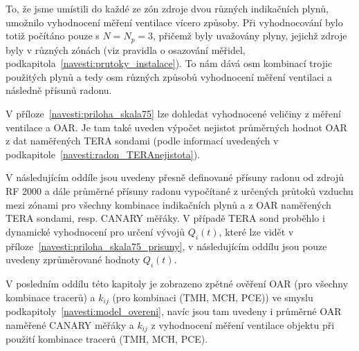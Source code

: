 To, že jsme umístili do každé ze zón zdroje dvou různých indikačních plynů, umožnilo vyhodnocení měření ventilace vícero způsoby. Při vyhodnocování bylo totiž počítáno pouze s $N=N_p=3$, přičemž byly uvažovány plyny, jejichž zdroje byly v různých zónách (viz pravidla o osazování měřidel, podkapitola~\ref{navesti:prutoky_instalace}). To nám dává osm kombinací trojic použitých plynů a tedy osm různých způsobů vyhodnocení měření ventilaci a následně přísunů radonu.

V příloze~\ref{navesti:priloha_skala75} lze dohledat vyhodnocené veličiny z měření ventilace a OAR. Je tam také uveden výpočet nejistot průměrných hodnot OAR z dat naměřených TERA sondami (podle informací uvedených v podkapitole~\ref{navesti:radon_TERAnejistota}). 

V následujícím oddíle jsou uvedeny přesně definované přísuny radonu od zdrojů RF 2000 a dále průměrné přísuny radonu vypočítané z určených průtoků vzduchu mezi zónami pro všechny kombinace indikačních plynů a z OAR naměřených TERA sondami, resp. CANARY měřáky. V případě TERA sond proběhlo i dynamické vyhodnocení pro určení vývojů $Q_i(t)$, které lze vidět v příloze~\ref{navesti:priloha_skala75_prisuny}, v následujícím oddílu jsou pouze uvedeny zprůměrované hodnoty $Q_i(t)$.

V posledním oddílu této kapitoly je zobrazeno zpětné ověření OAR (pro všechny kombinace tracerů) a $k_{ij}$ (pro kombinaci (TMH, MCH, PCE)) ve smyslu podkapitoly~\ref{navesti:model_overeni}, navíc jsou tam uvedeny i průměrné OAR naměřené CANARY měřáky a $k_{ij}$ z vyhodnocení měření ventilace objektu při použití kombinace tracerů (TMH, MCH,
PCE).


